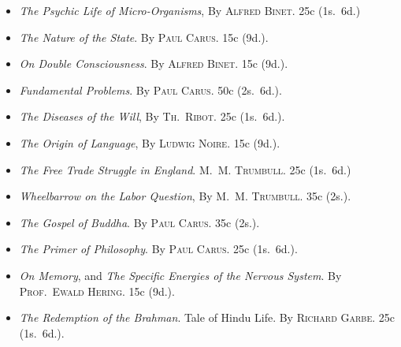 \documentclass[oneside]{book}
\begin{document}
\begin{small}
\begin{itemize}
\item[]\hspace{-3ex}
\textit{The Psychic Life of Micro-Organisms},  By \textsc{Alfred Binet}. 25c (1s.~6d.)

\item[]\hspace{-3ex}
\textit{The Nature of the State}. By \textsc{Paul Carus}. 15c (9d.).

\item[]\hspace{-3ex}
\textit{On Double Consciousness}. By \textsc{Alfred Binet.} 15c (9d.).

\item[]\hspace{-3ex}
\textit{Fundamental Problems}. By \textsc{Paul Carus}. 50c (2s.~6d.).

\item[]\hspace{-3ex} \textit{The Diseases of the Will}, By \textsc{Th.~Ribot}. 25c (1s.~6d.).

\item[]\hspace{-3ex}
\textit{The Origin of Language}, By \textsc{Ludwig Noire}. 15c (9d.).

\item[]\hspace{-3ex}
\textit{The Free Trade Struggle in England}. \textsc{M.~M. Trumbull}. 25c (1s.~6d.)

\item[]\hspace{-3ex}
\textit{Wheelbarrow on the Labor Question}, By \textsc{M.~M. Trumbull}. 35c (2s.).

\item[]\hspace{-3ex}
\textit{The Gospel of Buddha}. By \textsc{Paul Carus}. 35c (2s.).

\item[]\hspace{-3ex}
\textit{The Primer of Philosophy}. By \textsc{Paul Carus}. 25c (1s.~6d.).

\item[]\hspace{-3ex}
\textit{On Memory}, and \textit{The Specific Energies of the Nervous System}. By \textsc{Prof.\
Ewald Hering}. 15c (9d.).

\item[]\hspace{-3ex}
\textit{The Redemption of the Brahman}. Tale of Hindu Life.  By \textsc{Richard
Garbe}. 25c (1s.~6d.).


\end{itemize}
\end{small}
\end{document}
